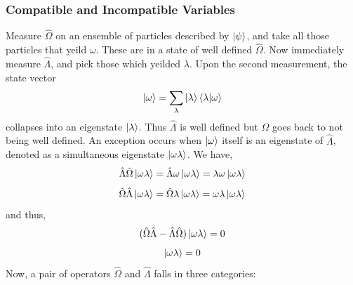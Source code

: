 \documentclass[12pt,a4paper]{report}
\begin{document}
\subsubsection{Compatible and Incompatible Variables}

Measure $\hat{\Omega}$ on an ensemble of particles described by $\ket{\psi}$, and take all those particles that yeild $\omega$. These are in a state of well defined $\hat{\Omega}$.
Now immediately measure $\hat{\Lambda}$, and pick those which yeilded $\lambda$. Upon the second measurement, the state vector
\begin{equation*}
    \ket{\omega} = \sum_\lambda\ket{\lambda}\bra{\lambda}\ket{\omega}
\end{equation*}
collapses into an eigenstate $\ket{\lambda}$. Thus $\hat{\Lambda}$ is well defined but $\hat{\Omega}$ goes back to not being well defined. An exception occurs when $\ket{\omega}$
itself is an eigenstate of $\hat{\Lambda}$, denoted as a simultaneous eigenstate $\ket{\omega\lambda}$. We have,
\begin{equation*}
    \hat{\Lambda}\hat{\Omega}\ket{\omega\lambda} = \hat{\Lambda}\omega\ket{\omega\lambda} = \lambda\omega\ket{\omega\lambda}
\end{equation*}
\begin{equation*}
    \hat{\Omega}\hat{\Lambda}\ket{\omega\lambda} = \hat{\Omega}\lambda\ket{\omega\lambda} = \omega\lambda\ket{\omega\lambda}
\end{equation*}
and thus,
\begin{equation*}
    (\hat{\Omega}\hat{\Lambda} - \hat{\Lambda}\hat{\Omega})\ket{\omega\lambda} = 0
\end{equation*}
\begin{equation*}
    [\hat{\Omega}, \hat{\Lambda}]\ket{\omega\lambda} = 0
\end{equation*}
Now, a pair of operators $\hat{\Omega}$ and $\hat{\Lambda}$ falls in three categories:
\end{document}
